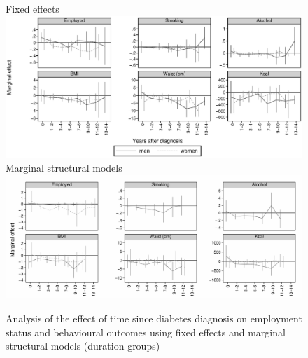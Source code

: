 \begin{figure}
\begin{center}
\caption{\label{fig:duration_g_fe_mi} Analysis of the effect of time since diabetes diagnosis on employment status and behavioural outcomes using fixed effects and marginal structural models (duration groups)}

Fixed effects
\includegraphics[width=\textwidth]{Chapter5/Figures/mi_fe}
Marginal structural models
\includegraphics[width=\textwidth]{Chapter5/Figures/mi_msm_l_all}
\end{center}
\end{figure}


